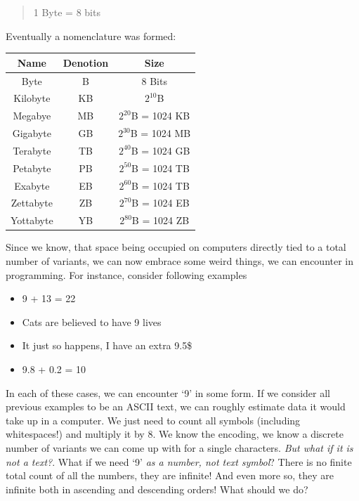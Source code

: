 \documentclass{article}
\begin{document}
            \begin{quote}
                \begin{center}
                    1 Byte = 8 bits                                    
                \end{center}
            \end{quote}

            Eventually a nomenclature was formed: 

            \begin{longtable}{|c|c|c|}
                \hline
                Name & Denotion & Size \\\hline
                Byte & B & 8 Bits \\\hline
                Kilobyte & KB & $2^{10}$B \\\hline
                Megabye & MB & $2^{20}$B = 1024 KB \\\hline
                Gigabyte & GB & $2^{30}$B = 1024 MB \\\hline
                Terabyte & TB & $2^{40}$B = 1024 GB \\\hline
                Petabyte & PB & $2^{50}$B = 1024 TB \\\hline
                Exabyte & EB & $2^{60}$B = 1024 TB \\\hline
                Zettabyte & ZB & $2^{70}$B = 1024 EB \\\hline
                Yottabyte & YB & $2^{80}$B = 1024 ZB \\\hline
            \end{longtable}

            Since we know, that space being occupied on computers directly tied to a total number of variants, we can now embrace some weird things, we can encounter
            in programming. For instance, consider following examples

            \begin{itemize}
                \item 9 + 13 = 22
                \item Cats are believed to have 9 lives
                \item It just so happens, I have an extra 9.5\$
                \item 9.8 + 0.2 = 10
            \end{itemize}

            In each of these cases, we can encounter `9' in some form. If we consider all previous examples to be an ASCII text, we can roughly estimate data it would take up in 
            a computer. We just need to count all symbols (including whitespaces!) and multiply it by 8. We know the encoding, we know a discrete number of variants we can
            come up with for a single characters. \emph{But what if it is not a text?}. What if we need `9' \emph{as a number, not text symbol}? There is no finite total count
            of all the numbers, they are infinite! And even more so, they are infinite both in ascending and descending orders! What should we do? \par
            
\end{document}
